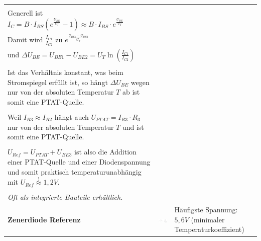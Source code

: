 \begin{longtable}{|l|l|l|}
\begin{minipage}{8cm}
			\textbf{Herleitung:} \\
			Generell ist $I_C = B \cdot I_{BS} \left(e^{\frac{U_{BE}}{U_T}} -1 \right)
							\approx B \cdot I_{BS} \cdot e^{\frac{U_{BE}}{U_T}}$ \\
			Damit wird $\frac{I_{C1}}{I_{C2}}$ zu $e^{\frac{U_{BE1}-U_{BE2}}{U_T}}$ \\
			und $\Delta U_{BE} = U_{BE1}-U_{BE2} = U_T \ln\left(\frac{I_{C1}}{I_{C2}}\right)$ \\
			\\
			Ist das Verhältnis \smash{$\frac{I_{C1}}{I_{C2}}$} konstant, was beim Stromspiegel
			erfüllt ist, so hängt $\Delta U_{BE}$ wegen \smash{$U_T=\frac{k \cdot T}{q}$} nur 
			von der absoluten Temperatur $T$ ab ist somit eine PTAT-Quelle. \\
			\\
			Weil $I_{R3} \approx I_{R2}$ hängt auch $U_{PTAT}=I_{R3} \cdot R_3$ nur von der
			absoluten Temperatur $T$ und ist somit eine PTAT-Quelle. \\
			\\
			$U_{Ref} = U_{PTAT} + U_{BE3}$ ist also die Addition einer PTAT-Quelle und einer
			Diodenspannung und somit praktisch temperaturunabhängig mit 
			$U_{Ref} \stackrel{!}{\approx} 1,2V$. \\
			\\
			\textit{Oft als integrierte Bauteile erhältlich.}
		\end{minipage}
	\\ \hline
		\begin{minipage}{4cm}
			\textbf{Zenerdiode Referenz}
		\end{minipage}
	&
		\begin{minipage}{6cm}
			\includegraphics[width=6cm,trim=0 0 0 -5]{images/zenerReferenz}
		\end{minipage}
	&
		\begin{minipage}{8cm}
			Häufigste Spannung: $5,6V$ (minimaler Temperaturkoeffizient)
		\end{minipage}
	\\ \hline
\end{longtable}

